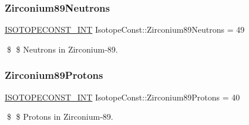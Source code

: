 \subsubsection{\texorpdfstring{Zirconium89\+Neutrons}{Zirconium89Neutrons}}
{\footnotesize\ttfamily \mbox{\hyperlink{group___isotope_const-_macros_ga5f18360b3e99483a35c32d789e62621c}{I\+S\+O\+T\+O\+P\+E\+C\+O\+N\+S\+T\+\_\+\+I\+NT}} Isotope\+Const\+::\+Zirconium89\+Neutrons = 49}

\$ \$ Neutrons in Zirconium-\/89. \mbox{\label{group___isotope_const-_zirconium-_zr89_ga2d42459543e54a32983d7ad5c23caa17}} 
\subsubsection{\texorpdfstring{Zirconium89\+Protons}{Zirconium89Protons}}
{\footnotesize\ttfamily \mbox{\hyperlink{group___isotope_const-_macros_ga5f18360b3e99483a35c32d789e62621c}{I\+S\+O\+T\+O\+P\+E\+C\+O\+N\+S\+T\+\_\+\+I\+NT}} Isotope\+Const\+::\+Zirconium89\+Protons = 40}

\$ \$ Protons in Zirconium-\/89. 